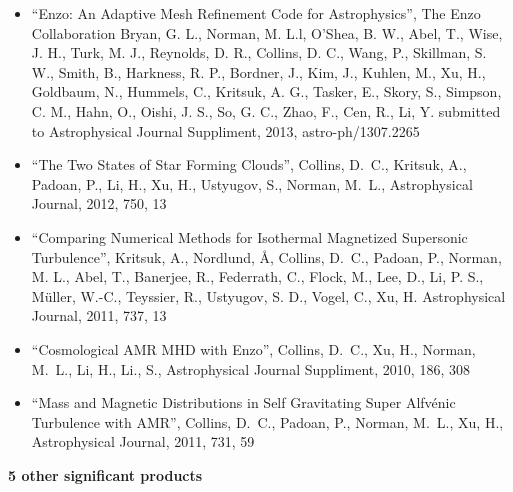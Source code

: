 \documentclass[11pt]{article}
\begin{document}
\begin{itemize}
  \item ``Enzo: An Adaptive Mesh Refinement Code for Astrophysics'', The Enzo
Collaboration 
Bryan, G. L., Norman, M. L.l, O’Shea, B. W.,  Abel, T.,  Wise, J. H.,
Turk, M. J., 
Reynolds, D. R.,
Collins, D. C.,
Wang, P., Skillman, S. W., Smith, B., Harkness, R. P., Bordner, J.,
Kim, J., Kuhlen, M., Xu, H.,
Goldbaum, N., Hummels, C., Kritsuk, A. G., Tasker, E., 
Skory, S., Simpson, C. M., Hahn, O., Oishi, J. S., So, G. C.,
Zhao, F., Cen, R., Li, Y.
submitted to Astrophysical Journal Suppliment, 2013,
astro-ph/1307.2265

\item 
``The Two States of Star Forming Clouds'', 
Collins, D.~C., Kritsuk, A., Padoan, P., Li, H., Xu, H., Ustyugov, S., Norman, M.~L.,
Astrophysical Journal, 2012, 750, 13

\item
``Comparing Numerical
Methods for Isothermal Magnetized Supersonic Turbulence'', 
Kritsuk, A., Nordlund, \AA, Collins, D.~C., 
Padoan, P., Norman, M. L., Abel, T., Banerjee, R., Federrath, C., Flock, M.,
Lee, D., Li, P. S., M\"uller, W.-C., Teyssier, R., Ustyugov, S. D., Vogel, C.,
Xu, H.
Astrophysical Journal, 2011, 737, 13

\item ``Cosmological AMR MHD with Enzo'', 
Collins, D.~C., Xu, H., Norman, M.~L., Li, H., Li., S.,
Astrophysical Journal Suppliment, 2010, 186, 308

\item
``Mass and Magnetic Distributions in Self Gravitating Super Alfv\' enic Turbulence with AMR'', 
Collins, D.~C., Padoan, P., Norman, M.~L., Xu, H.,
Astrophysical Journal, 2011, 731, 59

\end{itemize}

\vspace{-2mm}
\noindent
\textbf{5 other significant products}
\vspace{-4mm}
\end{document}
